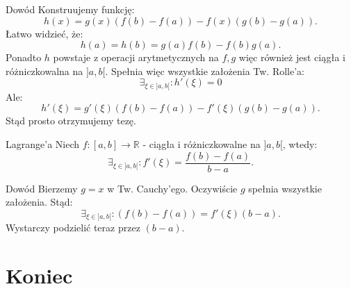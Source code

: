 \documentclass{article}
\numberwithin{defi}{section}
\numberwithin{defi}{section}
\newcommand{\R}{\mathbb{R}}
\begin{document}
    \begin{dow}{Dowód}
        Konstruujemy funkcję: \begin{equation*}
            h(x) = g(x) (f(b) - f(a)) - f(x) (g(b) - g(a)).
        \end{equation*} Łatwo widzieć, że: \begin{equation*}
            h(a) = h(b) = g(a)f(b) - f(b) g(a).
        \end{equation*} Ponadto $h$ powstaje z operacji arytmetycznych na $f, g$ więc również jest ciągła i różniczkowalna na $]a, b[$. Spełnia więc wszystkie założenia Tw. Rolle'a: \begin{equation*}
            \exists_{\xi \in ]a, b[ }: h'(\xi) = 0
        \end{equation*} Ale: \begin{equation*}
            h'(\xi) = g'(\xi) (f(b) - f(a)) - f'(\xi) (g(b) - g(a)).
        \end{equation*} Stąd prosto otrzymujemy tezę.
    \end{dow}

    \begin{twier}{Lagrange'a}
        Niech $f: [a, b] \to \R$ - ciągła i różniczkowalne na $]a, b[$, wtedy:\begin{equation}
            \exists_{\xi \in ]a, b[ }:f'(\xi)  =  \frac{f(b) - f(a)}{b - a}.
        \end{equation} 
    \end{twier}

    \begin{dow}{Dowód}
        Bierzemy $g = x$ w Tw. Cauchy'ego. Oczywiście $g$ spełnia wszystkie założenia. Stąd: \begin{equation}
            \exists_{\xi \in ]a, b[ }:  (f(b) - f(a)) = f'(\xi) (b - a).
        \end{equation} Wystarczy podzielić teraz przez $(b - a)$.
    \end{dow}

\newpage
\section*{Koniec}
\newpage
\tableofcontents
\end{document}
